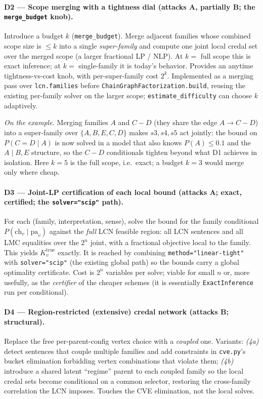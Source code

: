 \documentclass[11pt]{article}
\begin{document}
\paragraph{D2 --- Scope merging with a tightness dial (attacks A, partially B; the \texttt{merge\_budget} knob).}
Introduce a budget $k$ (\texttt{merge\_budget}). Merge adjacent families whose combined scope size is $\le k$ into a
single \emph{super-family} and compute one joint local credal set over the merged scope
(a larger fractional LP / NLP). At $k=$ full scope this is exact inference; at $k=$
single-family it is today's behavior. Provides an anytime tightness-vs-cost knob, with
per-super-family cost $2^k$. Implemented as a merging pass over \texttt{lcn.families} before
\texttt{ChainGraphFactorization.build}, reusing the existing per-family solver on the larger
scope; \texttt{estimate\_difficulty} can choose $k$ adaptively.

\smallskip\noindent\emph{On the example.} Merging families $A$ and $C\!-\!D$ (they share the
edge $A\!\to\!C\!-\!D$) into a super-family over $\{A,B,E,C,D\}$ makes $s3,s4,s5$ act jointly:
the bound on $P(C{=}D\mid A)$ is now solved in a model that also knows $P(A)\le0.1$ and the
$A\mid B,E$ structure, so the $C\!-\!D$ conditionals tighten beyond what D1 achieves in
isolation. Here $k{=}5$ is the full scope, i.e.\ exact; a budget $k{=}3$ would merge only
where cheap.

\paragraph{D3 --- Joint-LP certification of each local bound (attacks A; exact, certified; the \texttt{solver="scip"} path).}
For each (family, interpretation, sense), solve the bound for the family conditional
$P(\mathrm{ch}_v\mid\mathrm{pa}_v)$ against the \emph{full} LCN feasible region: all LCN
sentences and all LMC equalities over the $2^n$ joint, with a fractional objective local to
the family. This yields $K_v^{\mathrm{true}}$ exactly. It is reached by combining
\texttt{method="linear-tight"} with \texttt{solver="scip"} (the existing global path) so the
bounds carry a global optimality certificate.
Cost is $2^n$ variables per solve; viable for small $n$ or, more usefully, as the
\emph{certifier} of the cheaper schemes (it is essentially \texttt{ExactInference} run per
conditional).

\paragraph{D4 --- Region-restricted (extensive) credal network (attacks B; structural).}
Replace the free per-parent-config vertex choice with a \emph{coupled} one. Variants:
\emph{(4a)} detect sentences that couple multiple families and add constraints in
\texttt{cve.py}'s bucket elimination forbidding vertex combinations that violate them;
\emph{(4b)} introduce a shared latent ``regime'' parent to each coupled family so the local
credal sets become conditional on a common selector, restoring the cross-family correlation
the LCN imposes. Touches the CVE elimination, not the local solves.
\end{document}
